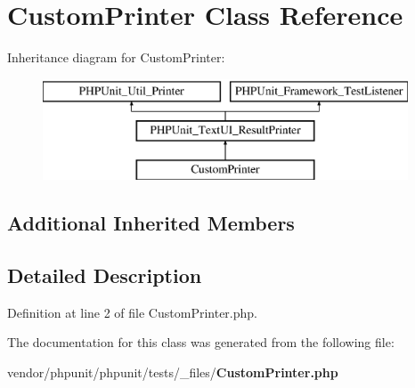 \section{Custom\+Printer Class Reference}
\label{class_custom_printer}
Inheritance diagram for Custom\+Printer\+:\begin{figure}[H]
\begin{center}
\leavevmode
\includegraphics[height=3.000000cm]{class_custom_printer}
\end{center}
\end{figure}
\subsection*{Additional Inherited Members}


\subsection{Detailed Description}


Definition at line 2 of file Custom\+Printer.\+php.



The documentation for this class was generated from the following file\+:\begin{DoxyCompactItemize}
\item 
vendor/phpunit/phpunit/tests/\+\_\+files/{\bf Custom\+Printer.\+php}\end{DoxyCompactItemize}
